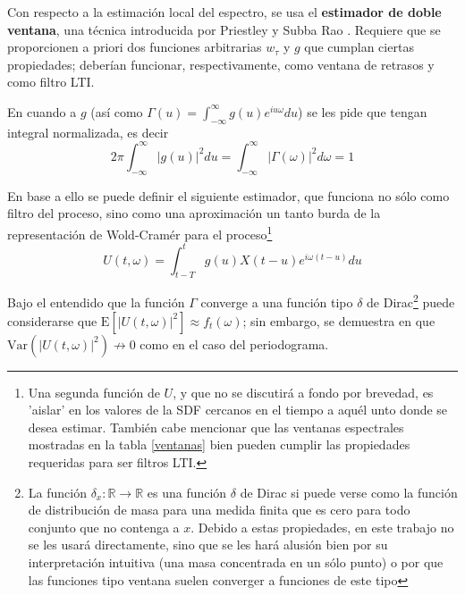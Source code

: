 \documentclass[12pt,a4paper]{mitthesis}
\newcommand{\R}{\mathbb{R}}
\newcommand{\intR}{\int_{-\infty}^{\infty}}
\newcommand{\E}[1]{\mathrm{E}\left[ #1 \right]}
\newcommand{\Var}[1]{\mathrm{Var}\left( #1 \right)}
\newcommand{\abso}[1]{\left| #1 \right|}
\begin{document}
Con respecto a la estimaci\'on local del espectro, se usa el \textbf{estimador de doble ventana},
una t\'ecnica introducida por Priestley y Subba Rao \cite{Priestley69}.
Requiere que se proporcionen a priori dos funciones arbitrarias $w_\tau$ y $g$ que cumplan ciertas
propiedades; deber\'ian funcionar, respectivamente, como ventana de retrasos y como filtro LTI.

En cuando a $g$ (as\'i como $\Gamma(u) = \intR g(u) e^{i u \omega} du$) se les pide que tengan 
integral normalizada, es decir
\begin{equation*}
2\pi \int_{-\infty}^{\infty} \lvert g(u) \lvert^{2} du 
= 
\int_{-\infty}^{\infty} \lvert \Gamma(\omega) \lvert^{2} d\omega
= 1
\end{equation*}

En base a ello se puede definir el siguiente estimador, que funciona no s\'olo como filtro del
proceso, sino como una aproximaci\'on un tanto burda de la representaci\'on de Wold-Cram\'er para 
el proceso\footnote{Una segunda funci\'on de $U$, y que no se discutir\'a a fondo por brevedad, es 
'aislar' en los valores de la SDF cercanos en el tiempo a aqu\'el unto donde se desea estimar.
Tambi\'en cabe mencionar que las ventanas espectrales mostradas en la tabla \ref{ventanas} bien 
pueden cumplir las propiedades requeridas para ser filtros LTI.}
\begin{equation*}
U(t,\omega) = \int_{t-T}^{t} g(u) X({t-u}) e^{i \omega (t-u)} du
\end{equation*}

Bajo el entendido que la funci\'on $\Gamma$ converge a una funci\'on tipo $\delta$ de 
Dirac\footnote{La funci\'on $\delta_x:\R\rightarrow \R$ es una funci\'on $\delta$ de Dirac si puede 
verse como la funci\'on de distribuci\'on de masa para una medida finita que es cero para todo 
conjunto que no contenga a $x$.
Debido a estas propiedades, en este trabajo no se les usar\'a directamente, sino que se les har\'a 
alusi\'on bien por su interpretaci\'on intuitiva (una masa concentrada en un s\'olo punto) o por 
que las funciones tipo ventana suelen converger a funciones de este tipo} puede considerarse que 
$\E{\abso{U(t,\omega)}^{2}} \approx f_t(\omega)$; sin embargo, se demuestra en \cite{Priestley66} 
que $\Var{\abso{U(t,\omega)}^{2}} \nrightarrow 0$ como en el caso del periodograma.
\end{document}
